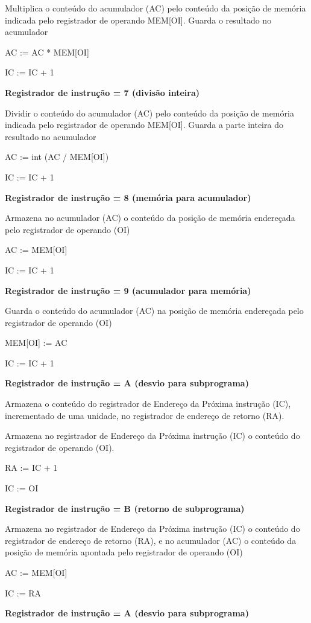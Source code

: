 Multiplica o conteúdo do acumulador (AC) pelo conteúdo da posição de memória indicada pelo registrador de operando MEM[OI]. Guarda o resultado no acumulador


AC := AC * MEM[OI] 


IC := IC + 1


\textbf{Registrador de instrução = 7 (divisão inteira)}


Dividir o conteúdo do acumulador (AC) pelo conteúdo da posição de memória indicada pelo registrador de operando MEM[OI]. Guarda a parte inteira do resultado no acumulador


AC := int (AC / MEM[OI])


IC := IC + 1 
			

\textbf{Registrador de instrução = 8 (memória para acumulador)}


Armazena no acumulador (AC) o conteúdo da posição de memória endereçada pelo registrador de operando (OI) 


AC := MEM[OI]		


IC := IC + 1
			

\textbf{Registrador de instrução = 9 (acumulador para memória)}


Guarda o conteúdo do acumulador (AC) na posição de memória endereçada pelo registrador de operando (OI) 


MEM[OI] := AC		


IC := IC + 1 
			

\textbf{Registrador de instrução = A (desvio para subprograma)}


Armazena o conteúdo do registrador de Endereço da Próxima instrução (IC), incrementado de uma unidade, no registrador de endereço de retorno (RA).


Armazena no registrador de Endereço da Próxima instrução (IC) o conteúdo do registrador de operando (OI).


RA := IC + 1


IC := OI


\textbf{Registrador de instrução = B (retorno de subprograma)}


Armazena no registrador de Endereço da Próxima instrução (IC) o conteúdo do registrador de endereço de retorno (RA), e no acumulador (AC) o conteúdo da posição de memória apontada pelo registrador de operando (OI) 


AC := MEM[OI]			


IC := RA 	 	 	 		
			

\textbf{Registrador de instrução = A (desvio para subprograma)}				 					


